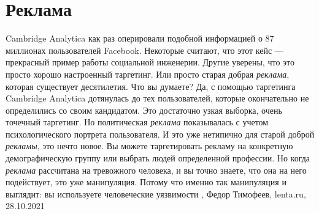  
 
 
 
 
\chapter{Реклама}

Cambridge Analytica как раз оперировали подобной информацией о 87 миллионах
пользователей Facebook. Некоторые считают, что этот кейс — прекрасный пример
работы социальной инженерии. Другие уверены, что это просто хорошо настроенный
таргетинг. Или просто старая добрая \emph{реклама}, которая существует десятилетия.
Что вы думаете?  Да, с помощью таргетинга Cambridge Analytica дотянулась до тех
пользователей, которые окончательно не определились со своим кандидатом. Это
достаточно узкая выборка, очень точечный таргетинг.  Но политическая \emph{реклама}
показывалась с учетом психологического портрета пользователя. И это уже
нетипично для старой доброй \emph{рекламы}, это нечто новое.  Вы можете таргетировать
рекламу на конкретную демографическую группу или выбрать людей определенной
профессии. Но когда \emph{реклама} рассчитана на тревожного человека, и вы точно
знаете, что она на него подействует, это уже манипуляция.  Потому что именно
так манипуляция и выглядит: вы используете человеческие уязвимости
, 
Федор Тимофеев, lenta.ru, 28.10.2021

